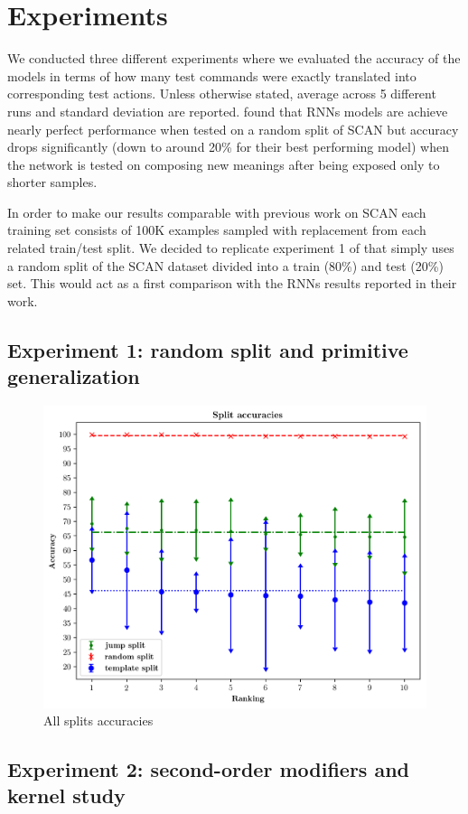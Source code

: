 \section{Experiments}
\label{sec:intro}

We conducted three different experiments where we evaluated the accuracy of the models in terms of how many test commands were exactly translated
into corresponding test actions. Unless otherwise stated, average across 5 different runs and standard deviation are reported.
\citet{Lake:Baroni:2017} found that RNNs models are achieve nearly perfect performance when tested on a random split of SCAN but accuracy drops significantly
(down to around 20\% for their best performing model) when the network is tested on composing new meanings after being exposed only to shorter samples.

In order to make our results comparable with previous work on SCAN each training set consists of 100K examples sampled with replacement
from each related train/test split. We decided to replicate experiment 1 of \cite{Lake:Baroni:2017} that simply uses a random split
of the SCAN dataset divided into a train (80\%) and test (20\%) set. This would act as a first comparison with the RNNs results reported in their work.

\subsection{Experiment 1: random split and primitive generalization}
\label{subsec:exp1}

\begin{figure}[h]
    \includegraphics[width=.5\textwidth,keepaspectratio]{figures/accuracies_all_splits.png}
    \centering
    \caption{All splits accuracies}
    \label{fig:accuracy_all_splits}
\end{figure}

\subsection{Experiment 2: second-order modifiers and kernel study}
\label{subsec:exp2}

